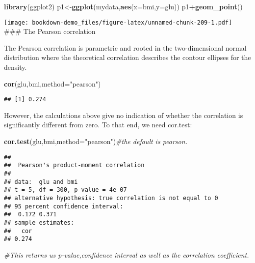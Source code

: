 \documentclass[]{book}
\newenvironment{Shaded}{\begin{snugshade}}{\end{snugshade}}
\newcommand{\KeywordTok}[1]{\textcolor[rgb]{0.13,0.29,0.53}{\textbf{#1}}}
\newcommand{\DataTypeTok}[1]{\textcolor[rgb]{0.13,0.29,0.53}{#1}}
\newcommand{\StringTok}[1]{\textcolor[rgb]{0.31,0.60,0.02}{#1}}
\newcommand{\CommentTok}[1]{\textcolor[rgb]{0.56,0.35,0.01}{\textit{#1}}}
\newcommand{\OperatorTok}[1]{\textcolor[rgb]{0.81,0.36,0.00}{\textbf{#1}}}
\newcommand{\NormalTok}[1]{#1}
\theoremstyle{definition}
\theoremstyle{definition}
\theoremstyle{definition}
\theoremstyle{remark}
\begin{document}
\begin{Shaded}
\begin{Highlighting}[]
\KeywordTok{library}\NormalTok{(ggplot2)}
\NormalTok{p1<-}\KeywordTok{ggplot}\NormalTok{(mydata,}\KeywordTok{aes}\NormalTok{(}\DataTypeTok{x=}\NormalTok{bmi,}\DataTypeTok{y=}\NormalTok{glu))}
\NormalTok{p1}\OperatorTok{+}\KeywordTok{geom_point}\NormalTok{()}
\end{Highlighting}
\end{Shaded}

\texttt{[image: bookdown-demo\_files/figure-latex/unnamed-chunk-209-1.pdf]}
\#\#\# The Pearson correlation

The Pearson correlation is parametric and rooted in the two-dimensional
normal distribution where the theoretical correlation describes the
contour ellipses for the density.

\begin{Shaded}
\begin{Highlighting}[]
\KeywordTok{cor}\NormalTok{(glu,bmi,}\DataTypeTok{method=}\StringTok{"pearson"}\NormalTok{)}
\end{Highlighting}
\end{Shaded}

\begin{verbatim}
## [1] 0.274
\end{verbatim}

However, the calculations above give no indication of whether the
correlation is significantly different from zero. To that end, we need
cor.test:

\begin{Shaded}
\begin{Highlighting}[]
\KeywordTok{cor.test}\NormalTok{(glu,bmi,}\DataTypeTok{method=}\StringTok{"pearson"}\NormalTok{)}\CommentTok{#the default is pearson.}
\end{Highlighting}
\end{Shaded}

\begin{verbatim}
## 
##  Pearson's product-moment correlation
## 
## data:  glu and bmi
## t = 5, df = 300, p-value = 4e-07
## alternative hypothesis: true correlation is not equal to 0
## 95 percent confidence interval:
##  0.172 0.371
## sample estimates:
##   cor 
## 0.274
\end{verbatim}

\begin{Shaded}
\begin{Highlighting}[]
\CommentTok{#This returns us p-value,confidence interval as well as the correlation coefficient.}
\end{Highlighting}
\end{Shaded}
\end{document}
